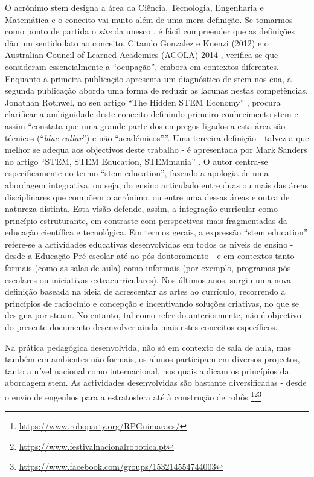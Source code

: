 O acrónimo \acrshort{stem} designa a área da Ciência, Tecnologia, Engenharia e Matemática e o conceito vai muito além de uma mera definição. Se tomarmos como ponto de partida o \textit{site} da \acrshort{unesco} \cite{GlossaryUNESCO}, é fácil compreender que as definições dão um sentido lato ao conceito. Citando Gonzalez e Kuenzi (2012) \cite{GonzalezKuenzi} e o Australian Council of Learned Academies (ACOLA) 2014 \cite{acola}, verifica-se que consideram essencialmente a ``ocupação'', embora em contextos diferentes. Enquanto a primeira publicação apresenta um diagnóstico de \acrshort{stem} nos \acrfull{eua}, a segunda publicação aborda uma forma de reduzir as lacunas nestas competências. Jonathan Rothwel, no seu artigo ``The Hidden STEM Economy'' \cite{TheHidde2}, procura clarificar a ambiguidade deste conceito definindo primeiro conhecimento \acrshort{stem} e assim ``constata que uma grande parte dos empregos ligados a esta área são técnicos (``\textit{blue-collar}'') e não ``académicos''''. Uma terceira definição - talvez a que melhor se adequa aos objectivos deste trabalho - é apresentada por Mark Sanders no artigo “STEM, STEM Education, STEMmania” \cite{TTTSTEMA77:online}. O autor centra-se especificamente no termo ``\acrshort{stem} education'', fazendo a apologia de uma abordagem integrativa, ou seja, do ensino articulado entre duas ou mais das áreas disciplinares que compõem o acrónimo, ou entre uma dessas áreas e outra de natureza distinta. Esta visão defende, assim, a integração curricular como princípio estruturante, em contraste com perspectivas mais fragmentadas da educação científica e tecnológica.
Em termos gerais, a expressão ``\acrshort{stem} education'' refere-se a actividades educativas desenvolvidas em todos os níveis de ensino - desde a Educação Pré-escolar até ao pós-doutoramento - e em contextos tanto formais (como as salas de aula) como informais (por exemplo, programas pós-escolares ou iniciativas extracurriculares). Nos últimos anos, surgiu uma nova definição baseada na ideia de acrescentar as artes ao currículo, recorrendo a princípios de raciocínio e concepção e incentivando soluções criativas, no que se designa por \acrfull{steam}. No entanto, tal como referido anteriormente, não é objectivo do presente documento desenvolver ainda mais estes conceitos específicos.

Na prática pedagógica desenvolvida, não só em contexto de sala de aula, mas também em ambientes não formais, os alunos participam em diversos projectos, tanto a nível nacional como internacional, nos quais aplicam os princípios da abordagem \acrshort{stem}. As actividades desenvolvidas são bastante diversificadas - desde o envio de engenhos para a estratosfera até à construção de robôs \footnote{\url{https://www.roboparty.org/RPGuimaraes/}}\footnote{\url{https://www.festivalnacionalrobotica.pt}}\footnote{\url{https://www.facebook.com/groups/153214554744003}}

